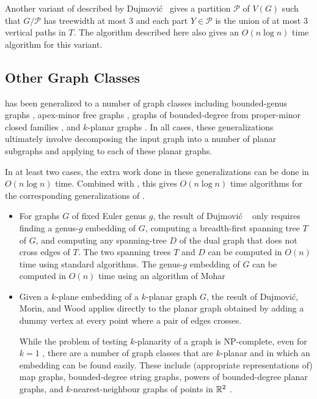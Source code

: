 \documentclass[kpfonts]{patmorin}
\begin{document}
Another variant of  described by Dujmović \etal\ gives a partition $\mathcal{P}$ of $V(G)$ such that $G/\mathcal{P}$ has treewidth at most 3 and each part $Y\in\mathcal{P}$ is the union of at most 3 vertical paths in $T$.  The algorithm described here also gives an $O(n\log n)$ time algorithm for this variant.

\subsection{Other Graph Classes}

 has been generalized to a number of graph classes including bounded-genus graphs \cite{dujmovic.joret.ea:planar}, apex-minor free graphs \cite{dujmovic.joret.ea:planar}, graphs of bounded-degree from proper-minor closed families \cite{dujmovic.esperet.ea:planar}, and $k$-planar graphs \cite{dujmovic.morin.ea:structure}.  In all cases, these generalizations ultimately involve decomposing the input graph into a number of planar subgraphs and applying  to each of these planar graphs.

In at least two cases, the extra work done in these generalizations can be done in $O(n\log n)$ time.  Combined with , this gives $O(n\log n)$ time algorithms for the corresponding generalizations of .

\begin{itemize}
  \item For graphs $G$ of fixed Euler genus $g$, the result of Dujmović \etal\ \cite{dujmovic.joret.ea:planar} only requires finding a genus-$g$ embedding of $G$, computing a breadth-first spanning tree $T$ of $G$, and computing any spanning-tree $D$ of the dual graph that does not cross edges of $T$.  The two spanning trees $T$ and $D$ can be computed in $O(n)$ time using standard algorithms.  The genus-$g$ embedding of $G$ can be computed in $O(n)$ time using an algorithm of Mohar \cite{mohar:linear}

  \item Given a $k$-plane embedding of a $k$-planar graph $G$, the result of Dujmović, Morin, and Wood \cite{dujmovic.morin.ea:structure} applies  directly to the planar graph obtained by adding a dummy vertex at every point where a pair of edges crosses.

  While the problem of testing $k$-planarity of a graph is NP-complete, even for $k=1$ \cite{grigoriev.bodlaender:algorithms,korzhik.mohar:minimal,urschel.wellens:testing}, there are a number of graph classes that are $k$-planar and in which an embedding can be found easily.  These include (appropriate representations of) map graphs, bounded-degree string graphs, powers of bounded-degree planar graphs, and $k$-nearest-neighbour graphs of points in $\mathbb{R}^2$ \cite[Section~8]{dujmovic.morin.ea:structure}.
\end{itemize}
\end{document}
